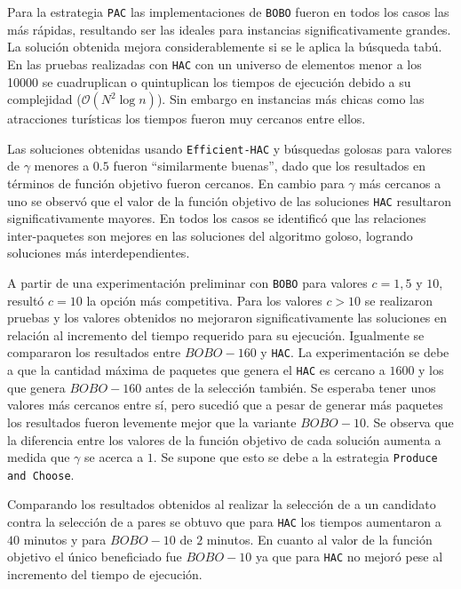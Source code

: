 Para la estrategia \texttt{PAC} las implementaciones de \texttt{BOBO} fueron en todos los casos las más rápidas, resultando ser las ideales para instancias significativamente grandes. La solución obtenida mejora considerablemente si se le aplica la búsqueda tabú. En las pruebas realizadas con \texttt{HAC} con un universo de elementos menor a los 10000 se cuadruplican o quintuplican los tiempos de ejecución debido a su complejidad ($\mathcal{O}(N^{2}\log n)$). Sin embargo en instancias más chicas como las atracciones turísticas los tiempos fueron muy cercanos entre ellos.

Las soluciones obtenidas usando \texttt{Efficient-HAC} y búsquedas golosas para valores de $\gamma$ menores a $0.5$ fueron \textquotedblleft similarmente buenas\textquotedblright , dado que los resultados en términos de función objetivo fueron cercanos. En cambio para $\gamma$ más cercanos a uno se observó que el valor de la función objetivo de las soluciones \texttt{HAC} resultaron significativamente mayores. En todos los casos se identificó que las relaciones inter-paquetes son mejores en las soluciones del algoritmo goloso, logrando soluciones más interdependientes.

A partir de una experimentación preliminar con \texttt{BOBO} para valores $c=1, 5$ y $10$, resultó $c=10$ la opción más competitiva. Para los valores $c>10$ se realizaron pruebas y los valores obtenidos no mejoraron significativamente las soluciones en relación al incremento del tiempo requerido para su ejecución. Igualmente se compararon los resultados entre $BOBO-160$ y \texttt{HAC}. La experimentación se debe a que la cantidad máxima de paquetes que genera el \texttt{HAC} es cercano a $1600$ y los que genera $BOBO-160$ antes de la selección también. Se esperaba tener unos valores más cercanos entre sí, pero sucedió que a pesar de generar más paquetes los resultados fueron levemente mejor que la variante $BOBO-10$. Se  observa que la diferencia entre los valores de la función objetivo de cada solución aumenta a medida que $\gamma$ se acerca a $1$. Se supone que esto se debe a la estrategia \texttt{Produce and Choose}.

Comparando los resultados obtenidos al realizar la selección de a un candidato contra la selección de a pares se obtuvo que para \texttt{HAC} los tiempos aumentaron a $40$ minutos y para $BOBO-10$ de $2$ minutos. En cuanto al valor de la función objetivo el único beneficiado fue $BOBO-10$ ya que para \texttt{HAC} no mejoró pese al incremento del tiempo de ejecución.